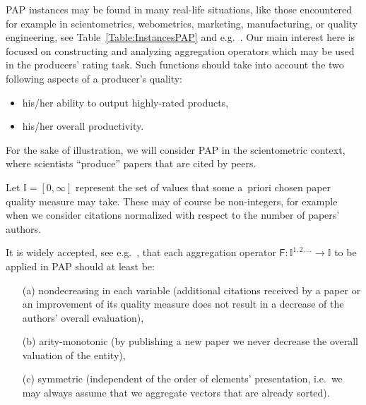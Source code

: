 \documentclass[11pt]{article}\usepackage[]{graphicx}\usepackage[]{color}
\newcommand{\func}[1]{{\mathsf{#1}}}
\newcommand{\Ival}{\mathbb{I}}
\newcommand{\AnyPow}{^{1,2,\dots}}
\newcommand{\IvalAnyPow}{\mathbb{I}\AnyPow}
\theoremstyle{remark}
\theoremstyle{definition}
\begin{document}
PAP instances may be found in many real-life
situations, like those encountered
for example in scientometrics, webometrics, marketing,
manufacturing, or quality
engineering, see Table~\ref{Table:InstancesPAP}
and e.g.~\cite{FranceschiniMaisano2009:hmanufacturing}.
Our main interest here is focused on constructing and analyzing
aggregation operators which may be used in the producers' rating task.
Such functions should take into account the two following
aspects of a producer's quality:
\begin{itemize}
\item his/her ability to output highly-rated products,
\item his/her overall productivity.
\end{itemize}

For the sake of illustration, we will consider PAP in the
scientometric context, where scientists ``produce''
papers that are cited by peers.

Let $\Ival=[0,\infty]$ represent the set of values that some a~priori chosen
paper quality measure may take. These may of course be non-integers,
for example when we consider citations normalized with respect
to the number of papers' authors.


It is widely accepted, see e.g.~\cite{Woeginger2008:axiomatich,
Woeginger2008:axiomaticg,
Woeginger2008:symmetryaxiom,Rousseau2008:woegingerax,Quesada2009:monotonicityh,
Quesada2010:moreaxiomatics,GagolewskiGrzegorzewski2011:ijar,
Gagolewski2011:PhD,FranceschiniMaisano2011:structevalh},
that each aggregation operator
 $\func{F}:\IvalAnyPow\to\Ival$ to be applied in  PAP  should at least be:
\begin{enumerate}
   \item[(a)] nondecreasing in each variable (additional
   citations received by a paper or an improvement
   of its quality measure does not result
   in a decrease of the authors' overall evaluation),
   \item[(b)] arity-monotonic (by publishing a new paper we
   never decrease the overall valuation of the entity),
   \item[(c)] symmetric (independent
of the order of elements' presentation, i.e.~we may always assume that
we aggregate vectors that are already sorted).
\end{enumerate}
\end{document}
